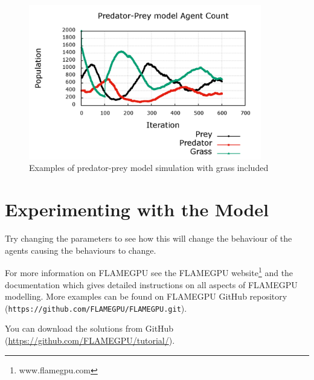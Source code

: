 \begin{figure}[!h]
    \centering
    \includegraphics[width=4in]{prey_predator_grass}
    \caption{Examples of predator-prey model simulation with grass included}
    \label{fig:simulation_Grass}
\end{figure}

\section{Experimenting with the Model}
Try changing the parameters to see how this will change the behaviour of the agents causing the behaviours to change.

For more information on FLAMEGPU see the FLAMEGPU website\footnote{www.flamegpu.com} and the documentation which gives detailed instructions on all aspects of FLAMEGPU modelling. More examples can be found on FLAMEGPU GitHub repository (\verb|https://github.com/FLAMEGPU/FLAMEGPU.git|).

You can download the solutions from GitHub (\href{https://github.com/FLAMEGPU/tutorial/}{https://github.com/FLAMEGPU/tutorial/}).
